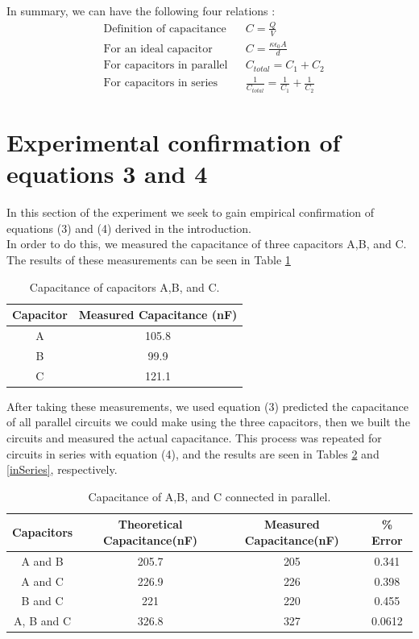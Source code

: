 \documentclass[oneside,12pt]{amsart}
\begin{document}
	\indent In summary, we can have the following four relations \cite{cap}\cite{parallel}:
	\begin{align}
	&\text{Definition of capacitance} &&	C = \frac{Q}{V}\\
	&\text{For an ideal capacitor} &&C = \frac{\kappa \epsilon _{0}A}{d}\\
	&\text{For capacitors in parallel} &&C_{total} = C_1 + C_2\\
	&\text{For capacitors in series} && \frac{1}{C_{total}} = \frac{1}{C_1}+\frac{1}{C_2}
	\end{align}
	
	\section{Experimental confirmation of equations 3 and 4}
	\indent In this section of the experiment we seek to gain empirical confirmation of equations (3) and (4) derived in the introduction.\\
	
	\indent In order to do this, we measured the capacitance of three capacitors A,B, and C. The results of these measurements can be seen in Table \ref{abc} 

	\begin{table}[h]
		\begin{tabular}{ |c|c|}
			\hline
			Capacitor & Measured Capacitance (nF)\\
			\hline
			A&105.8\\
			B&99.9\\
			C&121.1\\
			\hline
		\end{tabular}
		\caption{Capacitance of capacitors A,B, and C.}
		\label{abc}
	\end{table}

	\indent After taking these measurements, we used equation (3) predicted the capacitance of all parallel circuits we could make using the three capacitors, then we built the circuits and measured the actual capacitance. This process was repeated for circuits in series with equation (4), and the results are seen in Tables \ref{inParallel} and \ref{inSeries}, respectively. 
	\begin{table}[h]
		\begin{tabular}{ |c|c|c|c|}
			\hline
			Capacitors & Theoretical Capacitance(nF)& Measured Capacitance(nF) &\% Error\\
			\hline
			A and B	&205.7&205&0.341\\
			A and C&226.9 & 226&0.398\\
			B and C&221&220&0.455\\
			A, B and C&326.8&327&0.0612\\
			\hline
		\end{tabular}
		\caption{Capacitance of A,B, and C connected in parallel.}
		\label{inParallel}
	\end{table}
\end{document}
